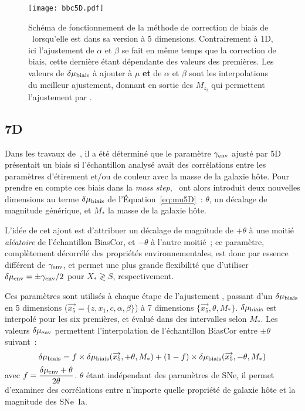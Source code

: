 \documentclass[../main/main.tex]{subfiles}
\begin{document}
\begin{figure}[]
    \centering
    \texttt{[image: bbc5D.pdf]}
    \caption[Schéma de fonctionnement de la méthode de correction de biais de
    \bbc5D]{Schéma de fonctionnement de la méthode de correction de biais de
        \bbc\ lorsqu'elle est dans sa version à 5 dimensions. Contrairement à
        \bbc1D, ici l'ajustement de $\alpha$ et $\beta$ se fait en même temps
        que la correction de biais, cette dernière étant dépendante des valeurs
        des premières. Les valeurs de $\delta\mu_{\rm biais}$ à ajouter à $\mu$
        \textbf{et} de $\alpha$ et $\beta$ sont les interpolations du meilleur
        ajustement, donnant en sortie des $M_{z_i}$ qui permettent l'ajustement
    par \wfit.}
    \label{fig:bbc5d}
\end{figure}

\subsection{\bbc7D}\label{ssec:bbc7D}

Dans les travaux de~\cite{smith2020}, il a été déterminé que le paramètre
$\gamma_{\rm env}$ ajusté par \bbc5D présentait un biais si l'échantillon
analysé avait des corrélations entre les paramètres d'étirement et/ou de couleur
avec la masse de la galaxie hôte. Pour prendre en compte ces biais dans la
\textit{mass step},~\cite{popovic2021a} ont alors introduit deux nouvelles
dimensions au terme $\delta\mu_{\rm biais}$ de l'Équation~\ref{eq:mu5D}~:
$\theta$, un décalage de magnitude générique, et $M_*$ la masse de la galaxie
hôte.

L'idée de cet ajout est d'attribuer un décalage de magnitude de $+\theta$ à une
moitié \textit{aléatoire} de l'échantillon BiasCor, et $-\theta$ à l'autre
moitié~; ce paramètre, complètement décorrélé des propriétés environnementales,
est donc par essence différent de $\gamma_{\rm env}$, et permet une plus grande
flexibilité que d'utiliser $\delta\mu_{\rm env} = \pm\gamma_{\rm env}/2$ pour
$X_* \gtrless S$, respectivement.

Ces paramètres sont utilisés à chaque étape de l'ajustement \bbc, passant d'un
$\delta\mu_{\rm biais}$ en 5 dimensions ($\overrightarrow{x_5} = \{z, x_1, c,
\alpha, \beta\}$) à 7 dimensions $\{\overrightarrow{x_5}, \theta, M_*\}$.
$\delta\mu_{\rm biais}$ est interpolé pour les six premières, et évalué dans des
intervalles selon $M_*$. Les valeurs $\delta\mu_{\rm env}$ permettent
l'interpolation de l'échantillon BiasCor entre $\pm\theta$ suivant~:
\begin{equation}
    \delta\mu_{\rm biais} =
    f\times\delta\mu_{\rm biais}(\overrightarrow{x_5}, +\theta, M_*)
    + (1-f)\times\delta\mu_{\rm biais}(\overrightarrow{x_5}, -\theta, M_*)
\end{equation}
avec $\displaystyle f = \frac{\delta\mu_{\rm env}+\theta}{2\theta}$. $\theta$ étant
indépendant des paramètres de SNe, il permet d'examiner des corrélations entre
n'importe quelle propriété de galaxie hôte et la magnitude des SNe~Ia.
\end{document}
